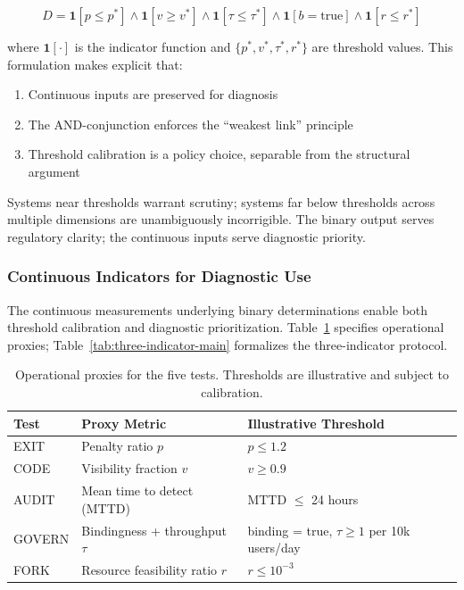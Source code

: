 \documentclass{article}
\begin{document}
\begin{equation}
D = \mathbf{1}[p \leq p^*] \land \mathbf{1}[v \geq v^*] \land \mathbf{1}[\tau \leq \tau^*] \land \mathbf{1}[b = \text{true}] \land \mathbf{1}[r \leq r^*]
\end{equation}

where $\mathbf{1}[\cdot]$ is the indicator function and $\{p^*, v^*, \tau^*, r^*\}$ are threshold values. This formulation makes explicit that:
\begin{enumerate}[noitemsep]
    \item Continuous inputs are preserved for diagnosis
    \item The AND-conjunction enforces the ``weakest link'' principle
    \item Threshold calibration is a policy choice, separable from the structural argument
\end{enumerate}

Systems near thresholds warrant scrutiny; systems far below thresholds across multiple dimensions are unambiguously incorrigible. The binary output serves regulatory clarity; the continuous inputs serve diagnostic priority.

\subsubsection{Continuous Indicators for Diagnostic Use}

The continuous measurements underlying binary determinations enable both threshold calibration and diagnostic prioritization. Table~\ref{tab:operational-proxies-main} specifies operational proxies; Table~\ref{tab:three-indicator-main} formalizes the three-indicator protocol.

\begin{table}[htbp]
\centering
\caption{Operational proxies for the five tests. Thresholds are illustrative and subject to calibration.}
\label{tab:operational-proxies-main}
\begin{tabular}{lll}
\toprule
\textbf{Test} & \textbf{Proxy Metric} & \textbf{Illustrative Threshold} \\
\midrule
EXIT & Penalty ratio $p$ & $p \leq 1.2$ \\
CODE & Visibility fraction $v$ & $v \geq 0.9$ \\
AUDIT & Mean time to detect (MTTD) & MTTD $\leq$ 24 hours \\
GOVERN & Bindingness + throughput $\tau$ & binding = true, $\tau \geq 1$ per 10k users/day \\
FORK & Resource feasibility ratio $r$ & $r \leq 10^{-3}$ \\
\bottomrule
\end{tabular}
\end{table}
\end{document}
